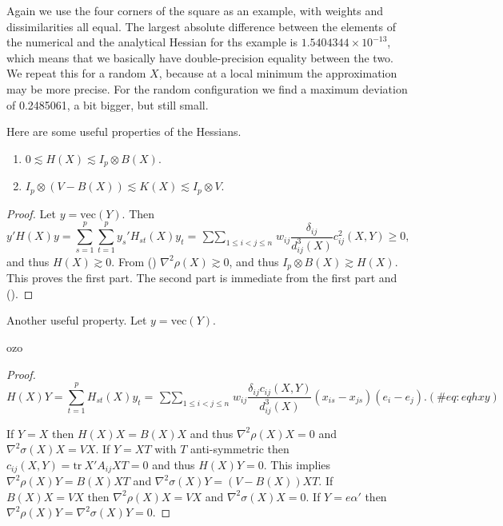 \documentclass[
  12pt,
  letterpaper,
  DIV=11,
  numbers=noendperiod]{scrreprt}
\providecommand{\tightlist}{%
  \setlength{\itemsep}{0pt}\setlength{\parskip}{0pt}}\usepackage{longtable,booktabs,array}
\theoremstyle{remark}
\begin{document}
Again we use the four corners of the square as an example, with weights
and dissimilarities all equal. The largest absolute difference between
the elements of the numerical and the analytical Hessian for ths example
is \ensuremath{1.5404344\times 10^{-13}}, which means that we basically
have double-precision equality between the two. We repeat this for a
random \(X\), because at a local minimum the approximation may be more
precise. For the random configuration we find a maximum deviation of
0.2485061, a bit bigger, but still small.

Here are some useful properties of the Hessians.

\label{hessbounds}
\begin{enumerate}
\def\labelenumi{\arabic{enumi}.}
\tightlist
\item
  \(0\lesssim H(X)\lesssim I_p\otimes B(X).\)
\item
  \(I_p\otimes(V-B(X))\lesssim K(X)\lesssim I_p\otimes V.\)
\end{enumerate}

\begin{proof}
Let \(y=\text{vec}(Y)\). Then \[
y'H(X)y=\sum_{s=1}^p\sum_{t=1}^p y_s'H_{st}(X)y_t=\mathop{\sum\sum}_{1\leq i<j\leq n}w_{ij}\frac{\delta_{ij}}{d_{ij}^3(X)}c_{ij}^2(X,Y)\geq 0,
\] and thus \(H(X)\gtrsim 0\). From () \(\nabla^2\rho(X)\gtrsim 0\), and
thus \(I_p\otimes B(X)\gtrsim H(X)\). This proves the first part. The
second part is immediate from the first part and ().
\end{proof}

Another useful property. Let \(y=\text{vec}(Y)\).

\label{hesseigen}
ozo

\begin{proof}
\begin{equation}
H(X)Y=\sum_{t=1}^p H_{st}(X)y_t=\mathop{\sum\sum}_{1\leq i<j\leq n}w_{ij}\frac{\delta_{ij}c_{ij}(X,Y)}{d_{ij}^3(X)}(x_{is}-x_{js})(e_i-e_j).
(\#eq:eqhxy)
\end{equation}

If \(Y=X\) then \(H(X)X=B(X)X\) and thus \(\nabla^2\rho(X)X=0\) and
\(\nabla^2\sigma(X)X=VX\). If \(Y=XT\) with \(T\) anti-symmetric then
\(c_{ij}(X,Y)=\text{tr}\ X'A_{ij}XT=0\) and thus \(H(X)Y=0\). This
implies \(\nabla^2\rho(X)Y=B(X)XT\) and
\(\nabla^2\sigma(X)Y=(V-B(X))XT\). If \(B(X)X=VX\) then
\(\nabla^2\rho(X)X=VX\) and \(\nabla^2\sigma(X)X=0\). If \(Y=e\alpha'\)
then \(\nabla^2\rho(X)Y=\nabla^2\sigma(X)Y=0\).
\end{proof}
\end{document}
